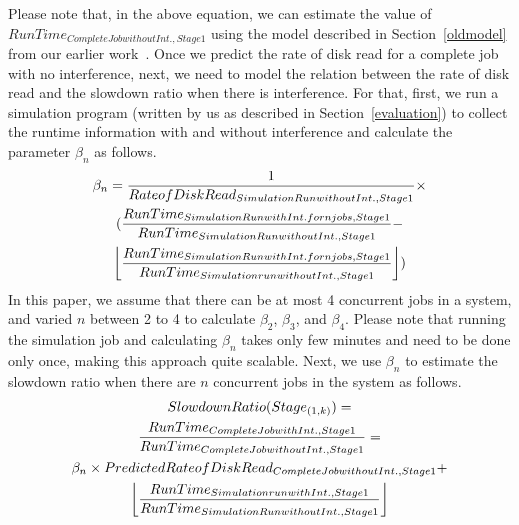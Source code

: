 \noindent
Please note that, in the above equation, we can estimate the value of $RunTime_{Complete Job without Int., Stage 1}$ using the model described in Section~\ref{oldmodel} from our earlier work~\cite{wangperformance}. Once we predict the rate of disk read for a complete job with no interference, next, we need to model the relation between the rate of disk read and the slowdown ratio when there is interference. For that, first, we run a simulation program (written by us as described in Section~\ref{evaluation}) to collect the runtime information with and without interference and calculate the parameter $\beta_{n}$ as follows.
\begin{equation}
\label{beta}
\begin{gathered}
\beta_{n} = \frac{1}{Rate of Disk Read_{Simulation Run without Int., Stage 1}} \times \\
(\frac{RunTime_{Simulation Run with Int. for n jobs, Stage 1}}{RunTime_{Simulation Run without Int., Stage 1}} - \\
\floor*{\frac{RunTime_{Simulation Run with Int. for n jobs, Stage 1}}{RunTime_{Simulation run without Int., Stage 1}}})
\end{gathered}
\end{equation}
\noindent
In this paper, we assume that there can be at most 4 concurrent jobs in a system, and varied $n$ between 2 to 4 to calculate $\beta_{2}$, $\beta_{3}$, and $\beta_{4}$. Please note that running the simulation job and calculating $\beta_{n}$ takes only few minutes and need to be done only once, making this approach quite scalable. Next, we use $\beta_{n}$ to estimate the slowdown ratio when there are $n$ concurrent jobs in the system as follows.
\begin{equation}
\label{slowdisk}
\begin{gathered}
SlowdownRatio(Stage_{(1,k)})=\\
\frac{RunTime_{Complete Job with Int., Stage 1}}{RunTime_{Complete Job without Int., Stage 1}} = \\
\beta_{n} \times PredictedRateofDiskRead_{Complete Job without Int., Stage 1} +\\ \floor*{\frac{Run Time_{Simulation run with Int., Stage 1}}{Run Time_{Simulation Run without Int., Stage 1}}}
\end{gathered}
\end{equation}
